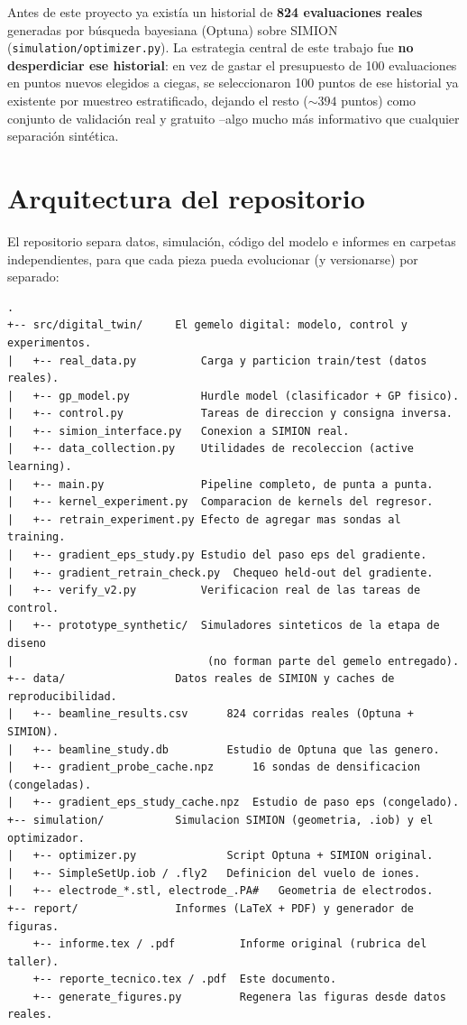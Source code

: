 \documentclass[11pt]{article}
\begin{document}
Antes de este proyecto ya existía un historial de \textbf{824 evaluaciones
reales} generadas por búsqueda bayesiana (Optuna) sobre SIMION
(\texttt{simulation/optimizer.py}). La estrategia central de este trabajo fue
\textbf{no desperdiciar ese historial}: en vez de gastar el presupuesto de
100 evaluaciones en puntos nuevos elegidos a ciegas, se seleccionaron 100
puntos de ese historial ya existente por muestreo estratificado, dejando el
resto (${\sim}394$ puntos) como conjunto de validación real y gratuito --algo
mucho más informativo que cualquier separación sintética.

\section{Arquitectura del repositorio}

El repositorio separa datos, simulación, código del modelo e informes en
carpetas independientes, para que cada pieza pueda evolucionar (y
versionarse) por separado:

\begin{verbatim}
.
+-- src/digital_twin/     El gemelo digital: modelo, control y experimentos.
|   +-- real_data.py          Carga y particion train/test (datos reales).
|   +-- gp_model.py           Hurdle model (clasificador + GP fisico).
|   +-- control.py            Tareas de direccion y consigna inversa.
|   +-- simion_interface.py   Conexion a SIMION real.
|   +-- data_collection.py    Utilidades de recoleccion (active learning).
|   +-- main.py               Pipeline completo, de punta a punta.
|   +-- kernel_experiment.py  Comparacion de kernels del regresor.
|   +-- retrain_experiment.py Efecto de agregar mas sondas al training.
|   +-- gradient_eps_study.py Estudio del paso eps del gradiente.
|   +-- gradient_retrain_check.py  Chequeo held-out del gradiente.
|   +-- verify_v2.py          Verificacion real de las tareas de control.
|   +-- prototype_synthetic/  Simuladores sinteticos de la etapa de diseno
|                              (no forman parte del gemelo entregado).
+-- data/                 Datos reales de SIMION y caches de reproducibilidad.
|   +-- beamline_results.csv      824 corridas reales (Optuna + SIMION).
|   +-- beamline_study.db         Estudio de Optuna que las genero.
|   +-- gradient_probe_cache.npz      16 sondas de densificacion (congeladas).
|   +-- gradient_eps_study_cache.npz  Estudio de paso eps (congelado).
+-- simulation/           Simulacion SIMION (geometria, .iob) y el optimizador.
|   +-- optimizer.py              Script Optuna + SIMION original.
|   +-- SimpleSetUp.iob / .fly2   Definicion del vuelo de iones.
|   +-- electrode_*.stl, electrode_.PA#   Geometria de electrodos.
+-- report/               Informes (LaTeX + PDF) y generador de figuras.
    +-- informe.tex / .pdf          Informe original (rubrica del taller).
    +-- reporte_tecnico.tex / .pdf  Este documento.
    +-- generate_figures.py         Regenera las figuras desde datos reales.
\end{verbatim}
\end{document}
